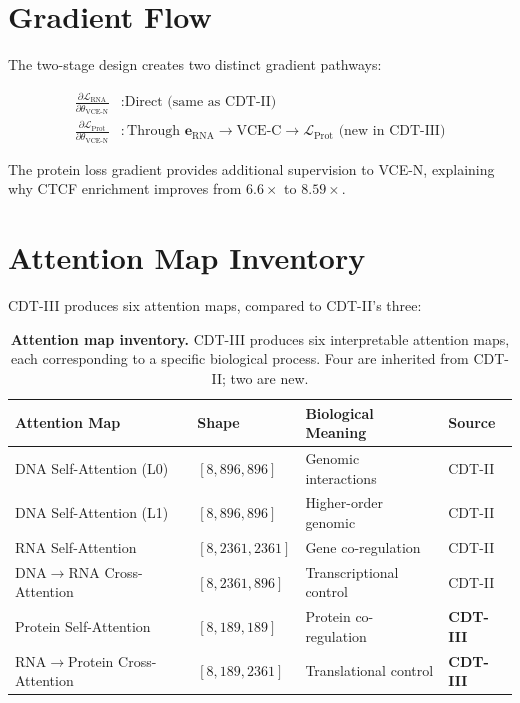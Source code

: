 \documentclass{article}
\begin{document}
\section{Gradient Flow}
\label{app:gradient}

The two-stage design creates two distinct gradient pathways:

\begin{align}
\frac{\partial \mathcal{L}_{\text{RNA}}}{\partial \theta_{\text{VCE-N}}} &: \text{Direct (same as CDT-II)} \\
\frac{\partial \mathcal{L}_{\text{Prot}}}{\partial \theta_{\text{VCE-N}}} &: \text{Through } \mathbf{e}_{\text{RNA}} \to \text{VCE-C} \to \mathcal{L}_{\text{Prot}} \text{ (new in CDT-III)}
\end{align}

The protein loss gradient provides additional supervision to VCE-N, explaining why CTCF enrichment improves from $6.6\times$ to $8.59\times$.

\section{Attention Map Inventory}
\label{app:attention}

CDT-III produces six attention maps, compared to CDT-II's three:

\begin{table}[h]
\centering
\caption{\textbf{Attention map inventory.} CDT-III produces six interpretable attention maps, each corresponding to a specific biological process. Four are inherited from CDT-II; two are new.}
\label{tab:attention_inventory}
\begin{tabular}{llll}
\toprule
Attention Map & Shape & Biological Meaning & Source \\
\midrule
DNA Self-Attention (L0) & $[8, 896, 896]$ & Genomic interactions & CDT-II \\
DNA Self-Attention (L1) & $[8, 896, 896]$ & Higher-order genomic & CDT-II \\
RNA Self-Attention & $[8, 2361, 2361]$ & Gene co-regulation & CDT-II \\
DNA$\to$RNA Cross-Attention & $[8, 2361, 896]$ & Transcriptional control & CDT-II \\
Protein Self-Attention & $[8, 189, 189]$ & Protein co-regulation & \textbf{CDT-III} \\
RNA$\to$Protein Cross-Attention & $[8, 189, 2361]$ & Translational control & \textbf{CDT-III} \\
\bottomrule
\end{tabular}
\end{table}
\end{document}
